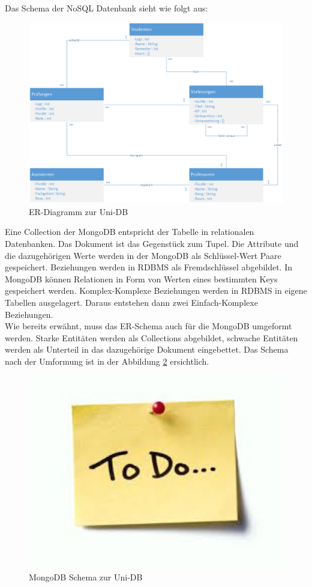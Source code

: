 Das Schema der NoSQL Datenbank sieht wie folgt aus:
\begin{figure}[h] 
	\centering
		\includegraphics[width=1\textwidth]{./pictures/NoSQL-DB_ER_Diagramm_UNI-DB.png}
	\caption{ER-Diagramm zur Uni-DB}
	\label{fig:uni-db}
\end{figure}
Eine Collection der MongoDB entspricht der Tabelle in relationalen Datenbanken.
Das Dokument ist das Gegenstück zum Tupel. Die Attribute und die dazugehörigen
Werte werden in der MongoDB als Schlüssel-Wert Paare gespeichert.
Beziehungen werden in RDBMS als Fremdschlüssel abgebildet. In MongoDB 
können Relationen in Form von Werten eines bestimmten Keys gespeichert werden.
Komplex-Komplexe Beziehungen werden in RDBMS in eigene
Tabellen ausgelagert. Daraus entstehen dann zwei Einfach-Komplexe
Beziehungen. \\
Wie bereits erwähnt, muss das ER-Schema auch für die MongoDB umgeformt werden.
Starke Entitäten werden als Collections abgebildet, schwache Entitäten werden 
als Unterteil in das dazugehörige Dokument eingebettet.
Das Schema nach der Umformung ist in der Abbildung \ref{fig:uni-dbNoSQL}
ersichtlich.
\begin{figure}[h] 
	\centering
		\includegraphics[width=1\textwidth]{./pictures/todo.jpg}
	\caption{MongoDB Schema zur Uni-DB }
	\label{fig:uni-dbNoSQL}
\end{figure}
